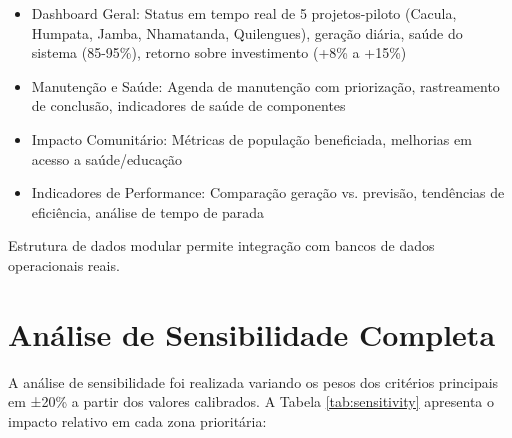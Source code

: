 \documentclass[12pt, a4paper]{article}
\begin{document}
\begin{itemize}
    \item Dashboard Geral: Status em tempo real de 5 projetos-piloto (Cacula, Humpata, Jamba, Nhamatanda, Quilengues), geração diária, saúde do sistema (85-95\%), retorno sobre investimento (+8\% a +15\%)
    \item Manutenção e Saúde: Agenda de manutenção com priorização, rastreamento de conclusão, indicadores de saúde de componentes
    \item Impacto Comunitário: Métricas de população beneficiada, melhorias em acesso a saúde/educação
    \item Indicadores de Performance: Comparação geração vs. previsão, tendências de eficiência, análise de tempo de parada
\end{itemize}

Estrutura de dados modular permite integração com bancos de dados operacionais reais.

\appendix

\section{Análise de Sensibilidade Completa}

A análise de sensibilidade foi realizada variando os pesos dos critérios principais em ±20\% a partir dos valores calibrados. A Tabela \ref{tab:sensitivity} apresenta o impacto relativo em cada zona prioritária:
\end{document}
